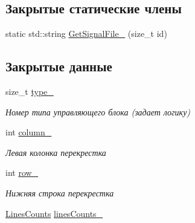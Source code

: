 \subsection*{Закрытые статические члены}
\begin{DoxyCompactItemize}
\item 
static std\+::string \hyperlink{classrtm_1_1_control_unit_ae30b470ee59e84fa14f1eb811a24d5ab}{Get\+Signal\+File\+\_\+} (size\+\_\+t id)
\end{DoxyCompactItemize}
\subsection*{Закрытые данные}
\begin{DoxyCompactItemize}
\item 
\mbox{\label{classrtm_1_1_control_unit_a831ba648d8df6aca6c2530bab19eae65}} 
size\+\_\+t \hyperlink{classrtm_1_1_control_unit_a831ba648d8df6aca6c2530bab19eae65}{type\+\_\+}
\begin{DoxyCompactList}\small\item\em Номер типа управляющего блока (задает логику) \end{DoxyCompactList}\item 
\mbox{\label{classrtm_1_1_control_unit_a9b3fa03f97a3f29e758e265c8ded4957}} 
int \hyperlink{classrtm_1_1_control_unit_a9b3fa03f97a3f29e758e265c8ded4957}{column\+\_\+}
\begin{DoxyCompactList}\small\item\em Левая колонка перекрестка \end{DoxyCompactList}\item 
\mbox{\label{classrtm_1_1_control_unit_aa3b238e5b91281a493bfb3fb24d01d66}} 
int \hyperlink{classrtm_1_1_control_unit_aa3b238e5b91281a493bfb3fb24d01d66}{row\+\_\+}
\begin{DoxyCompactList}\small\item\em Нижняя строка перекрестка \end{DoxyCompactList}\item 
\mbox{\label{classrtm_1_1_control_unit_a98e098f07ff00685089fa55f0b569802}} 
\hyperlink{namespacertm_a14457f3088a92b86a96686b72d3e4eea}{Lines\+Counts} \hyperlink{classrtm_1_1_control_unit_a98e098f07ff00685089fa55f0b569802}{lines\+Counts\+\_\+}

\end{DoxyCompactItemize}
